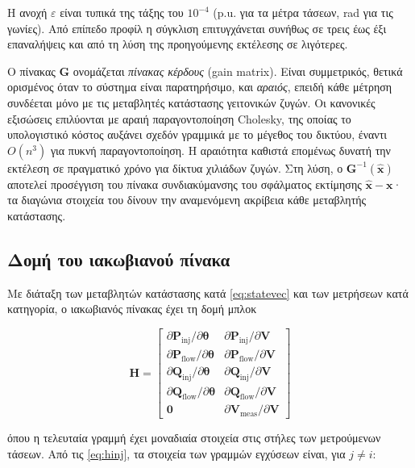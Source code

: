 Η ανοχή $\varepsilon$ είναι τυπικά της τάξης του $10^{-4}$ (p.u. για τα μέτρα τάσεων, rad για
τις γωνίες). Από επίπεδο προφίλ η σύγκλιση επιτυγχάνεται συνήθως σε τρεις έως έξι επαναλήψεις
και από τη λύση της προηγούμενης εκτέλεσης σε λιγότερες.

Ο πίνακας $\mathbf{G}$ ονομάζεται \emph{πίνακας κέρδους} (gain matrix). Είναι συμμετρικός,
θετικά ορισμένος όταν το σύστημα είναι παρατηρήσιμο, και \emph{αραιός}, επειδή κάθε μέτρηση
συνδέεται μόνο με τις μεταβλητές κατάστασης γειτονικών ζυγών. Οι κανονικές εξισώσεις
επιλύονται με αραιή παραγοντοποίηση Cholesky, της οποίας το υπολογιστικό κόστος αυξάνει
σχεδόν γραμμικά με το μέγεθος του δικτύου, έναντι $O(n^3)$ για πυκνή παραγοντοποίηση. Η
αραιότητα καθιστά επομένως δυνατή την εκτέλεση σε πραγματικό χρόνο για δίκτυα χιλιάδων
ζυγών. Στη λύση, ο $\mathbf{G}^{-1}(\hat{\mathbf{x}})$ αποτελεί προσέγγιση του πίνακα
συνδιακύμανσης του σφάλματος εκτίμησης $\hat{\mathbf{x}} - \mathbf{x}$· τα διαγώνια στοιχεία
του δίνουν την αναμενόμενη ακρίβεια κάθε μεταβλητής κατάστασης.

\subsection{Δομή του ιακωβιανού πίνακα}

Με διάταξη των μεταβλητών κατάστασης κατά \eqref{eq:statevec} και των μετρήσεων κατά
κατηγορία, ο ιακωβιανός πίνακας έχει τη δομή μπλοκ

\begin{equation}
\mathbf{H} =
\begin{bmatrix}
\partial \mathbf{P}_{\mathrm{inj}} / \partial \boldsymbol{\theta} & \partial \mathbf{P}_{\mathrm{inj}} / \partial \mathbf{V} \\
\partial \mathbf{P}_{\mathrm{flow}} / \partial \boldsymbol{\theta} & \partial \mathbf{P}_{\mathrm{flow}} / \partial \mathbf{V} \\
\partial \mathbf{Q}_{\mathrm{inj}} / \partial \boldsymbol{\theta} & \partial \mathbf{Q}_{\mathrm{inj}} / \partial \mathbf{V} \\
\partial \mathbf{Q}_{\mathrm{flow}} / \partial \boldsymbol{\theta} & \partial \mathbf{Q}_{\mathrm{flow}} / \partial \mathbf{V} \\
\mathbf{0} & \partial \mathbf{V}_{\mathrm{meas}} / \partial \mathbf{V}
\end{bmatrix}
\label{eq:jacblocks}
\end{equation}

όπου η τελευταία γραμμή έχει μοναδιαία στοιχεία στις στήλες των μετρούμενων τάσεων. Από τις
\eqref{eq:hinj}, τα στοιχεία των γραμμών εγχύσεων είναι, για $j \neq i$:

